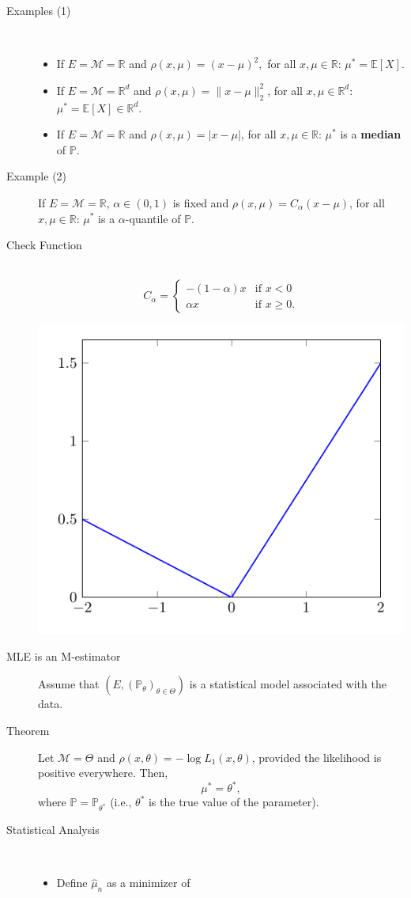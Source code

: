 \documentclass[a4paper, 10pt,landscape]{article}
\begin{document}
\begin{multicols*}{3}
\begin{description}
	\item[Examples (1)] ~
	\begin{itemize}
		\item If $E=\mathcal{M}=\mathbb{R}$ and $\rho(x,\mu)=(x-\mu)^2,$ for all $x,\mu\in\mathbb{R}$: $\mu^*=\mathbb{E}\left[X\right]$.
		\item If $E=\mathcal{M}=\mathbb{R}^d$ and $\rho(x,\mu)=\lVert x-\mu\rVert_2^2$, for all $x,\mu\in\mathbb{R}^d$: $\mu^*=\mathbb{E}\left[X\right]\in\mathbb{R}^d$.
		\item If $E=\mathcal{M}=\mathbb{R}$ and $\rho(x,\mu)=|x-\mu|$, for all $x,\mu\in\mathbb{R}$: $\mu^*$ is a {\bf median} of $\mathbb{P}$.
	\end{itemize}
	\item[Example (2)] If $E=\mathcal{M}=\mathbb{R}$, $\alpha\in(0,1)$ is fixed and $\rho(x,\mu)=C_\alpha(x-\mu)$, for all $x,\mu\in\mathbb{R}$: $\mu^*$ is a $\alpha$-quantile of $\mathbb{P}$.
	\item[Check Function] ~
	$$C_\alpha=\begin{cases}
	-(1-\alpha)x&\text{if }x<0\\
	\alpha x&\text{if }x\geq0.
	\end{cases}$$
	\begin{center}
		\includegraphics[width=0.4\columnwidth]{check.pdf}
	\end{center}
	\item[MLE is an M-estimator] Assume that $\left(E,\left(\mathbb{P}_\theta\right)_{\theta\in\Theta}\right)$ is a statistical model associated with the data.
	\item[Theorem] Let $\mathcal{M}=\Theta$ and $\rho(x,\theta)=-\log L_1(x,\theta)$, provided the likelihood is positive everywhere. Then,
	$$\mu^*=\theta^*,$$
	where $\mathbb{P}=\mathbb{P}_{\theta^*}$ (i.e., $\theta^*$ is the true value of the parameter).
	\item[Statistical Analysis] ~
	\begin{itemize}
		\item Define $\hat{\mu}_n$ as a minimizer of

\end{itemize}
\end{description}
\end{multicols*}
\end{document}
